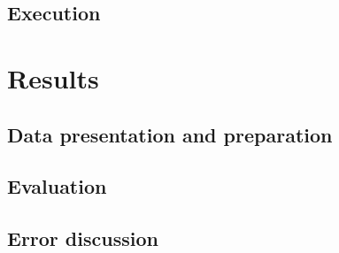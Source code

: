 \section{Execution}

\chapter{Results}
\label{chap:results}

\section{Data presentation and preparation}

\section{Evaluation}

\section{Error discussion}